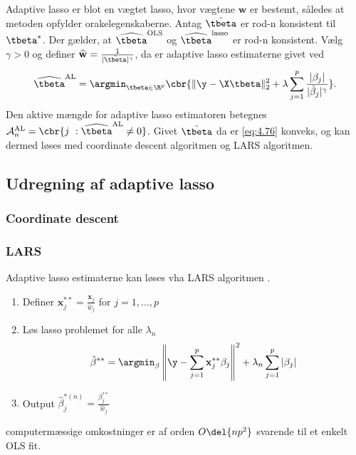 Adaptive lasso er blot en vægtet lasso, hvor vægtene \(\mathbf{w}\) er bestemt, således at metoden opfylder orakelegenskaberne.
Antag \(\tilde{\tbeta}\) er rod-n konsistent til \(\tbeta^*\). Der gælder, at \(\widehat{\tbeta}^\text{OLS}\) og \(\widehat{\tbeta}^\text{lasso}\) er rod-n konsistent.
Vælg \(\gamma>0\) og definer \(\widehat{\mathbf{w}} = \frac{1}{\vert \tilde{\tbeta} \vert^\gamma}\), da er adaptive lasso  estimaterne givet ved
\begin{align}
\widehat{\tbeta}^\text{AL} = \argmin_{\tbeta \in \R^p} \cbr{ \Vert \y - \X \tbeta \Vert_2^2 + \lambda \sum_{j=1}^p \frac{ \vert \beta_j \vert}{\vert \tilde{\beta}_j \vert^\gamma}}. \label{eq:4.76}
\end{align}
Den aktive mængde for adaptive lasso estimatoren betegnes \(\mathcal{A}_n^\text{AL} = \cbr{j \ : \widehat{\tbeta}^{\text{AL}} \neq 0 }\).
Givet \(\tilde{\tbeta}\) da er \eqref{eq:4.76} konveks, og kan dermed løses med coordinate descent algoritmen og LARS algoritmen.
%
\subsection{Udregning af adaptive lasso}

\subsubsection{Coordinate descent}

\subsubsection{LARS}
Adaptive lasso estimaterne kan løses vha LARS algoritmen \citep{efron}.
\begin{enumerate}
\item Definer \(\mathbf{x}_j^{**} = \frac{\mathbf{x}_j}{\hat{w}_j}\) for \(j=1, \ldots, p\)
\item Løs lasso problemet for alle \(\lambda_n\)
\begin{align*}
\hat{\beta}^{**} = \argmin_{\beta} \left\Vert \y - \sum_{j=1}^p \mathbf{x}_j^{**} \beta_j \right\Vert^2 + \lambda_n \sum_{j=1}^p \vert \beta_j \vert
\end{align*}
\item Output \(\hat{\beta}_j^{*(n)} = \frac{\beta_j^{**}}{\hat{w}_j}\)
\end{enumerate}
computermæssige omkostninger er af orden \(O\del{np^2}\) svarende til et enkelt OLS fit.

